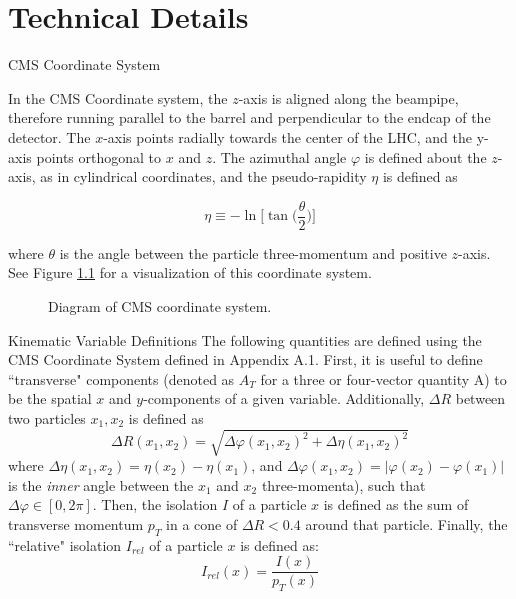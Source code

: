\chapter{Technical Details}
\begin{section}{CMS Coordinate System}\label{appendix:cms-coords}

In the CMS Coordinate system, the $z$-axis is aligned along the beampipe, therefore running parallel to the barrel and perpendicular to the endcap of the detector. The $x$-axis points radially towards the center of the LHC, and the y-axis points orthogonal to $x$ and $z$. The azimuthal angle $\varphi$ is defined about the $z$-axis, as in cylindrical coordinates, and the pseudo-rapidity $\eta$ is defined as

\begin{equation}
    \eta \equiv -\ln{\bigg[ \tan{\bigg( \frac{\theta}{2} \bigg)} \bigg]}
\end{equation}

\noindent where $\theta$ is the angle between the particle three-momentum and positive $z$-axis. See Figure \ref{fig:cms-coords} for a visualization of this coordinate system.

\begin{figure}[htb]
\begin{center}

\end{center}
\caption{Diagram of CMS coordinate system.}
\label{fig:cms-coords}
\end{figure}

\end{section}

\begin{section}{Kinematic Variable Definitions}
The following quantities are defined using the CMS Coordinate System defined in Appendix A.1. First, it is useful to define ``transverse" components (denoted as $A_{T}$ for a three or four-vector quantity A) to be the spatial $x$ and $y$-components of a given variable. Additionally, $\Delta R$ between two particles $x_1, x_2$ is defined as
\begin{equation}
    \Delta R(x_1, x_2) = \sqrt{\Delta\varphi(x_1, x_2)^{2}+\Delta\eta(x_1, x_2)^{2}}
\end{equation}
\noindent where $\Delta\eta(x_1, x_2) = \eta(x_2)-\eta(x_1)$, and $\Delta\varphi(x_1, x_2) = |\varphi(x_2) - \varphi(x_1)|$ is the \textit{inner} angle between the $x_1$ and $x_2$ three-momenta), such that $\Delta\varphi \in [0, 2\pi]$. Then, the isolation $I$ of a particle $x$ is defined as the sum of transverse momentum $p_{T}$ in a cone of $\Delta R < 0.4$\cite{cite-iso-dR} around that particle. Finally, the ``relative" isolation $I_{rel}$ of a particle $x$ is defined as:
\begin{equation}
    I_{rel}(x) = \frac{I(x)}{p_{T}(x)}
\end{equation}
\end{section}

